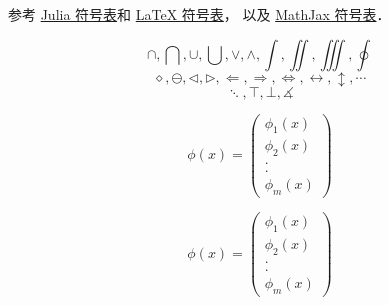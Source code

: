 
参考 \href{https://docs.julialang.org/en/v1/manual/unicode-input/}{Julia 符号表}和 \href{https://oeis.org/wiki/List_of_LaTeX_mathematical_symbols}{LaTeX 符号表}， 以及 \href{http://www.onemathematicalcat.org/MathJaxDocumentation/TeXSyntax.htm#U}{MathJax 符号表}．

\begin{equation}
\cap, \bigcap, \cup, \bigcup, \vee, \wedge, \int, \iint, \iiint, \oint
\end{equation}
\begin{equation}
\diamond, \ominus, \triangleleft, \triangleright, \Longleftarrow, \Longrightarrow, \iff, \leftrightarrow, \updownarrow, \cdots
\end{equation}
\begin{equation}
\ddots, \top, \bot, \measuredangle
\end{equation}

$$
\phi(x) = \left(
\begin{array} {ccc} \phi_1(x) \\ \phi_2 (x) \\ .\\ .\\ \phi_m(x)
\end{array}
\right)
$$

\begin{equation}
\phi(x) = \left(
		\begin{array} {ccc} \phi_1(x) \\ \phi_2 (x) \\ .\\ .\\ \phi_m(x)
		\end{array}
	      \right)
\end{equation}
